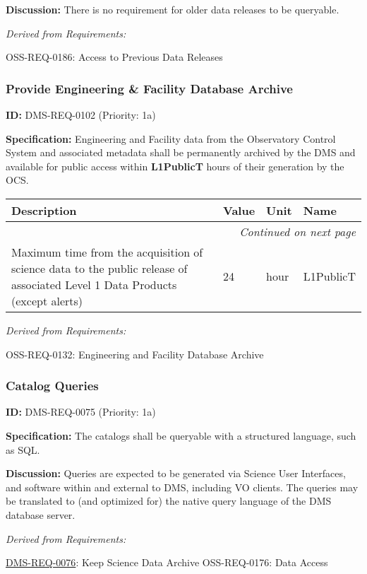 \documentclass[SE,toc,lsstdraft]{lsstdoc}
\makeatletter
\newcommand{\paramname}[1]{\hspace{0pt}#1}
\newcommand{\unitname}[1]{\hspace{0pt}#1}
\newenvironment{parameters}[0]{%
\setlength\LTleft{0pt}
\setlength\LTright{\fill}
\begin{small}
\begin{longtable}[]{|p{0.49\textwidth}|l|p{0.6in}|p{1.70in}@{}|}

\hline \textbf{Description} & \textbf{Value} & \textbf{Unit} & \textbf{Name} \\ \hline
\endhead

\hline \multicolumn{4}{r}{\emph{Continued on next page}} \\
\endfoot

\hline\hline
\endlastfoot
}{%
\hline
\end{longtable}
\end{small}
}
\makeatother
\begin{document}
\textbf{Discussion: }There is no requirement for older data releases to be queryable.

\emph{Derived from Requirements:}

OSS-REQ-0186:
Access to Previous Data Releases \newline

\subsubsection{Provide Engineering \& Facility Database Archive}

\label{DMS-REQ-0102}
\textbf{ID:} DMS-REQ-0102 (Priority: 1a)

\textbf{Specification:} Engineering and Facility data from the Observatory Control System and associated metadata shall be permanently archived by the DMS and available for public access within \textbf{L1PublicT} hours of their generation by the OCS.

\begin{parameters}
Maximum time from the acquisition of science data to the public release of associated Level 1 Data Products (except alerts)
&
24
&
\unitname{%
hour
}
&
\paramname{%
L1PublicT
} \\\hline
\end{parameters}

\emph{Derived from Requirements:}

OSS-REQ-0132:
Engineering and Facility Database Archive \newline

\subsubsection{Catalog Queries}

\label{DMS-REQ-0075}
\textbf{ID:} DMS-REQ-0075 (Priority: 1a)

\textbf{Specification:} The catalogs shall be queryable with a structured language, such as SQL.

\textbf{Discussion:} Queries are expected to be generated via Science User Interfaces, and software within and external to DMS, including VO clients. The queries may be translated to (and optimized for) the native query language of the DMS database server.

\emph{Derived from Requirements:}

\hyperref[DMS-REQ-0076]{DMS-REQ-0076}:
Keep Science Data Archive \newline
OSS-REQ-0176:
Data Access \newline
\end{document}

